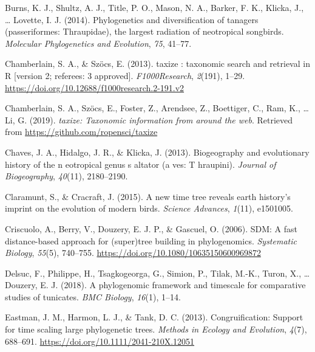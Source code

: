 \documentclass[
  english,
  man]{apa6}
\newlength{\cslhangindent}
\newlength{\cslentryspacingunit} %
\newenvironment{CSLReferences}[2] %
 {%
  \setlength{\parindent}{0pt}
  \ifodd #1
  \let\oldpar\par
  \def\par{\hangindent=\cslhangindent\oldpar}
  \fi
  \setlength{\parskip}{#2\cslentryspacingunit}
 }%
 {}
\begin{document}
\begin{CSLReferences}{1}{0}
\leavevmode{}%
Burns, K. J., Shultz, A. J., Title, P. O., Mason, N. A., Barker, F. K., Klicka, J., \ldots{} Lovette, I. J. (2014). Phylogenetics and diversification of tanagers (passeriformes: Thraupidae), the largest radiation of neotropical songbirds. \emph{{Molecular Phylogenetics and Evolution}}, \emph{75}, 41--77.

\leavevmode{}%
Chamberlain, S. A., \& Szöcs, E. (2013). {taxize : taxonomic search and retrieval in R {[}version 2; referees: 3 approved{]}}. \emph{{F1000Research}}, \emph{2}(191), 1--29. \url{https://doi.org/10.12688/f1000research.2-191.v2}

\leavevmode{}%
Chamberlain, S. A., Szöcs, E., Foster, Z., Arendsee, Z., Boettiger, C., Ram, K., \ldots{} Li, G. (2019). \emph{{taxize: Taxonomic information from around the web}}. Retrieved from \url{https://github.com/ropensci/taxize}

\leavevmode{}%
Chaves, J. A., Hidalgo, J. R., \& Klicka, J. (2013). Biogeography and evolutionary history of the n eotropical genus s altator (a ves: T hraupini). \emph{Journal of Biogeography}, \emph{40}(11), 2180--2190.

\leavevmode{}%
Claramunt, S., \& Cracraft, J. (2015). A new time tree reveals earth history's imprint on the evolution of modern birds. \emph{{Science Advances}}, \emph{1}(11), e1501005.

\leavevmode{}%
Criscuolo, A., Berry, V., Douzery, E. J. P., \& Gascuel, O. (2006). {SDM: A fast distance-based approach for (super)tree building in phylogenomics}. \emph{{Systematic Biology}}, \emph{55}(5), 740--755. \url{https://doi.org/10.1080/10635150600969872}

\leavevmode{}%
Delsuc, F., Philippe, H., Tsagkogeorga, G., Simion, P., Tilak, M.-K., Turon, X., \ldots{} Douzery, E. J. (2018). A phylogenomic framework and timescale for comparative studies of tunicates. \emph{BMC Biology}, \emph{16}(1), 1--14.

\leavevmode{}%
Eastman, J. M., Harmon, L. J., \& Tank, D. C. (2013). {Congruification: Support for time scaling large phylogenetic trees}. \emph{{Methods in Ecology and Evolution}}, \emph{4}(7), 688--691. \url{https://doi.org/10.1111/2041-210X.12051}


\end{CSLReferences}
\end{document}
